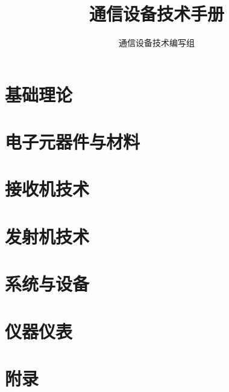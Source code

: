 \documentclass{book}
\title{通信设备技术手册}
\author{通信设备技术编写组}
\date{}
\begin{document}
\maketitle

\tableofcontents

\part{基础理论}




\part{电子元器件与材料}





\part{接收机技术}









\part{发射机技术}


\part{系统与设备}




\part{仪器仪表}





\part{附录}





\backmatter
\end{document}
